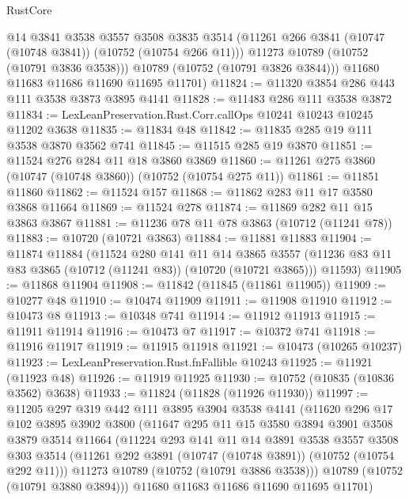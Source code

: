 \begin{lexlean}{RustCore}
\begin{coremodule}
          @14
          @3841
          @3538
          @3557
          @3508
          @3835
          @3514
          (@11261 @266 @3841 (@10747 (@10748 @3841)) (@10752 (@10754 @266 @11)))
          @11273
          @10789
          (@10752 (@10791 @3836 @3538)))
        @10789
        (@10752 (@10791 @3826 @3844)))
      @11680
      @11683
      @11686
      @11690
      @11695
      @11701)
@11824 := @11320 @3854 @286 @443 @111 @3538 @3873 @3895 @4141
@11828 := @11483 @286 @111 @3538 @3872
@11834 := LexLeanPreservation.Rust.Corr.callOps @10241 @10243 @10245 @11202 @3638
@11835 := @11834 @48
@11842 := @11835 @285 @19 @111 @3538 @3870 @3562 @741
@11845 := @11515 @285 @19 @3870
@11851 := @11524 @276 @284 @11 @18 @3860 @3869
@11860 := @11261 @275 @3860 (@10747 (@10748 @3860)) (@10752 (@10754 @275 @11))
@11861 := @11851 @11860
@11862 := @11524 @157
@11868 := @11862 @283 @11 @17 @3580 @3868 @11664
@11869 := @11524 @278
@11874 := @11869 @282 @11 @15 @3863 @3867
@11881 := @11236 @78 @11 @78 @3863 (@10712 (@11241 @78))
@11883 := @10720 (@10721 @3863)
@11884 := @11881 @11883
@11904 := @11874
    @11884
    (@11524
      @280
      @141
      @11
      @14
      @3865
      @3557
      (@11236 @83 @11 @83 @3865 (@10712 (@11241 @83)) (@10720 (@10721 @3865)))
      @11593)
@11905 := @11868 @11904
@11908 := @11842 (@11845 (@11861 @11905))
@11909 := @10277 @48
@11910 := @10474 @11909
@11911 := @11908 @11910
@11912 := @10473 @8
@11913 := @10348 @741
@11914 := @11912 @11913
@11915 := @11911 @11914
@11916 := @10473 @7
@11917 := @10372 @741
@11918 := @11916 @11917
@11919 := @11915 @11918
@11921 := @10473 (@10265 @10237)
@11923 := LexLeanPreservation.Rust.fnFallible @10243
@11925 := @11921 (@11923 @48)
@11926 := @11919 @11925
@11930 := @10752 (@10835 (@10836 @3562) @3638)
@11933 := @11824 (@11828 (@11926 @11930))
@11997 := @11205
    @297
    @319
    @442
    @111
    @3895
    @3904
    @3538
    @4141
    (@11620
      @296
      @17
      @102
      @3895
      @3902
      @3800
      (@11647
        @295
        @11
        @15
        @3580
        @3894
        @3901
        @3508
        @3879
        @3514
        @11664
        (@11224
          @293
          @141
          @11
          @14
          @3891
          @3538
          @3557
          @3508
          @303
          @3514
          (@11261 @292 @3891 (@10747 (@10748 @3891)) (@10752 (@10754 @292 @11)))
          @11273
          @10789
          (@10752 (@10791 @3886 @3538)))
        @10789
        (@10752 (@10791 @3880 @3894)))
      @11680
      @11683
      @11686
      @11690
      @11695
      @11701)

\end{coremodule}
\end{lexlean}
